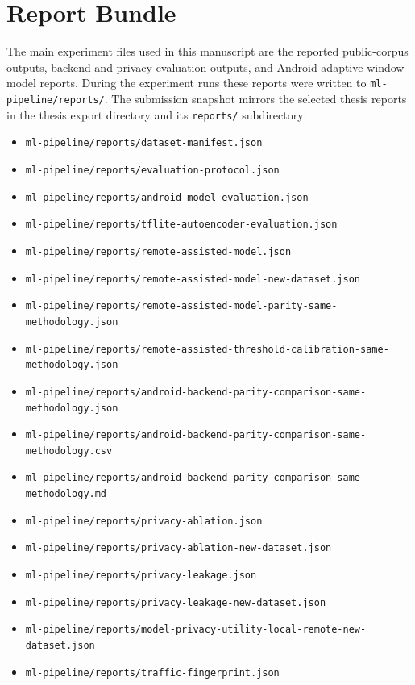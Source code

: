 \section{Report Bundle}
The main experiment files used in this manuscript are the reported public-corpus outputs, backend and
privacy evaluation outputs, and Android adaptive-window model reports. During the experiment runs these reports
were written to \texttt{ml-pipeline/reports/}. The submission snapshot mirrors the selected thesis
reports in the thesis export directory and its \texttt{reports/} subdirectory:
{\footnotesize
\begin{itemize}[leftmargin=*]
  \item \texttt{ml-pipeline/reports/dataset-manifest.json}
  \item \texttt{ml-pipeline/reports/evaluation-protocol.json}
  \item \texttt{ml-pipeline/reports/android-model-evaluation.json}
  \item \texttt{ml-pipeline/reports/tflite-autoencoder-evaluation.json}
  \item \texttt{ml-pipeline/reports/remote-assisted-model.json}
  \item \texttt{ml-pipeline/reports/remote-assisted-model-new-dataset.json}
  \item \texttt{ml-pipeline/reports/remote-assisted-model-parity-same-methodology.json}
  \item \texttt{ml-pipeline/reports/remote-assisted-threshold-calibration-same-methodology.json}
  \item \texttt{ml-pipeline/reports/android-backend-parity-comparison-same-methodology.json}
  \item \texttt{ml-pipeline/reports/android-backend-parity-comparison-same-methodology.csv}
  \item \texttt{ml-pipeline/reports/android-backend-parity-comparison-same-methodology.md}
  \item \texttt{ml-pipeline/reports/privacy-ablation.json}
  \item \texttt{ml-pipeline/reports/privacy-ablation-new-dataset.json}
  \item \texttt{ml-pipeline/reports/privacy-leakage.json}
  \item \texttt{ml-pipeline/reports/privacy-leakage-new-dataset.json}
  \item \texttt{ml-pipeline/reports/model-privacy-utility-local-remote-new-dataset.json}
  \item \texttt{ml-pipeline/reports/traffic-fingerprint.json}

\end{itemize}}
